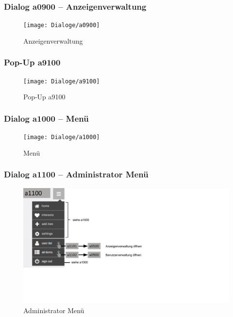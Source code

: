 \documentclass[a4paper,12pt,oneside]{scrartcl}
\begin{document}
\newpage
\subsubsection{Dialog a0900 – Anzeigenverwaltung}
\begin{figure}[!htbp]
\centering
\noindent\texttt{[image: Dialoge/a0900]}
\caption{Anzeigenverwaltung}
\end{figure}
\FloatBarrier

\newpage
\subsubsection{Pop-Up a9100}
\begin{figure}[!htbp]
\centering
\noindent\texttt{[image: Dialoge/a9100]}
\caption{Pop-Up a9100}
\end{figure}
\FloatBarrier

\newpage
\subsubsection{Dialog a1000 – Menü}
\begin{figure}[!htbp]
\centering
\noindent\texttt{[image: Dialoge/a1000]}
\caption{Menü}
\end{figure}
\FloatBarrier

\newpage
\subsubsection{Dialog a1100 – Administrator Menü}
\begin{figure}[!htbp]
\centering
\noindent\includegraphics[width=\linewidth,height=\textheight,keepaspectratio]{Dialoge/a1100}
\caption{Administrator Menü}
\end{figure}
\FloatBarrier
\end{document}
